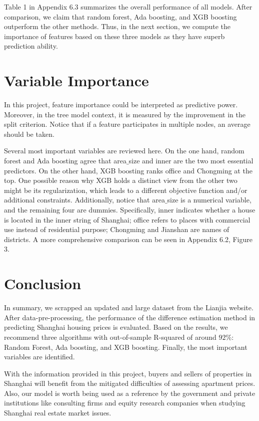 \documentclass[11pt,a4paper]{article}
\begin{document}
 Table 1 in Appendix 6.3 summarizes the overall performance of all models. After comparison, we claim that random forest, Ada boosting, and XGB boosting outperform the other methods. Thus, in the next section, we compute the importance of features based on these three models as they have superb prediction ability.
 \section{Variable Importance}
 In this project, feature importance could be interpreted as predictive power. Moreover, in the tree model context, it is measured by the improvement in the split criterion. Notice that if a feature participates in multiple nodes, an average should be taken.

Several most important variables are reviewed here. On the one hand, random forest and Ada boosting agree that area$\_$size and inner are the two most essential predictors. On the other hand, XGB boosting ranks office and Chongming at the top. One possible reason why XGB holds a distinct view from the other two might be its regularization, which leads to a different objective function and/or additional constraints. Additionally, notice that area$\_$size is a numerical variable, and the remaining four are dummies. Specifically, inner indicates whether a house is located in the inner string of Shanghai; office refers to places with commercial use instead of residential purpose; Chongming and Jianshan are names of districts. A more comprehensive comparison can be seen in Appendix 6.2, Figure 3.
\section{Conclusion}
In summary, we scrapped an updated and large dataset from the Lianjia website. After data-pre-processing, the performance of the difference estimation method in predicting Shanghai housing prices is evaluated. Based on the results, we recommend three algorithms with out-of-sample R-squared of around $92\%$: Random Forest, Ada boosting, and XGB boosting. Finally, the most important variables are identified. 

With the information provided in this project, buyers and sellers of properties in Shanghai will benefit from the mitigated difficulties of assessing apartment prices. Also, our model is worth being used as a reference by the government and private institutions like consulting firms and equity research companies when studying Shanghai real estate market issues.
 
\end{document}
